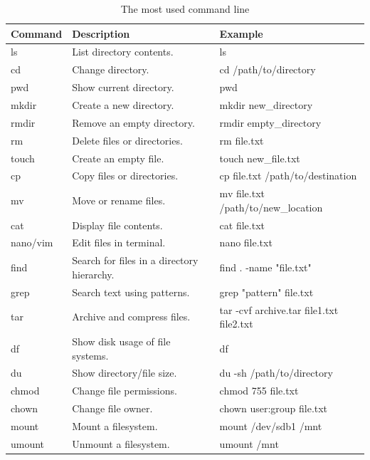 \documentclass[12pt, a4paper]{article}
\begin{document}
\begin{table}[H] 
    \centering 
\begin{tabular}{ l | l | l } 
        \hline 
        \rowcolor{gray!40}
        \textbf{Command} & \textbf{Description} & \textbf{Example} \\ \hline
        
        ls      &	List directory contents.          & ls \\ \hline
        cd      &	Change directory.                 & cd /path/to/directory \\ \hline
        pwd     &	Show current directory.           & pwd \\ \hline
        mkdir   &	Create a new directory.           & mkdir new\_directory \\ \hline
        rmdir   &	Remove an empty directory.        & rmdir empty\_directory \\ \hline
        rm      &   Delete files or directories.      & rm file.txt \\ \hline
        touch   &	Create an empty file.             & touch new\_file.txt \\ \hline
        cp      &	Copy files or directories.        & cp file.txt /path/to/destination \\ \hline
        mv      &	Move or rename files.             & mv file.txt /path/to/new\_location \\ \hline
        cat     &	Display file contents.            & cat file.txt \\ \hline
        nano/vim&   Edit files in terminal.       & nano file.txt \\ \hline
        find    &	Search for files in a directory hierarchy.	& find . -name "file.txt" \\ \hline
        grep    &	Search text using patterns.	      & grep "pattern" file.txt \\ \hline
        tar     &	Archive and compress files.	      & tar -cvf archive.tar file1.txt file2.txt \\ \hline
        df      &	Show disk usage of file systems.  & df \\ \hline
        du      &	Show directory/file size.         & du -sh /path/to/directory \\ \hline
        chmod   &	Change file permissions.          & chmod 755 file.txt \\ \hline
        chown   &	Change file owner.                & chown user:group file.txt \\ \hline
        mount   &	Mount a filesystem.	              & mount /dev/sdb1 /mnt \\ \hline
        umount  &	Unmount a filesystem.             & umount /mnt \\ \hline
    \end{tabular}
    \caption{The most used command line}
    \label{commandline}
\end{table}
\end{document}
